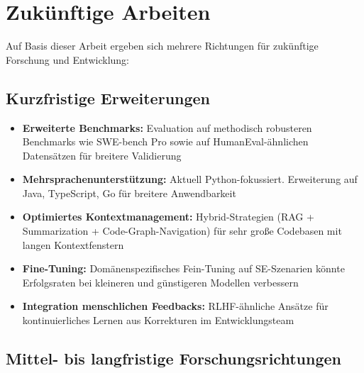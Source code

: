 \section{Zukünftige Arbeiten}

Auf Basis dieser Arbeit ergeben sich mehrere Richtungen für zukünftige Forschung und Entwicklung:

\subsection{Kurzfristige Erweiterungen}

\begin{itemize}
  \item \textbf{Erweiterte Benchmarks:} Evaluation auf methodisch robusteren Benchmarks wie SWE-bench Pro sowie auf HumanEval-ähnlichen Datensätzen für breitere Validierung
  
  \item \textbf{Mehrsprachenunterstützung:} Aktuell Python-fokussiert. Erweiterung auf Java, TypeScript, Go für breitere Anwendbarkeit
  
  \item \textbf{Optimiertes Kontextmanagement:} Hybrid-Strategien (RAG + Summarization + Code-Graph-Navigation) für sehr große Codebasen mit langen Kontextfenstern
  
  \item \textbf{Fine-Tuning:} Domänenspezifisches Fein-Tuning auf SE-Szenarien könnte Erfolgsraten bei kleineren und günstigeren Modellen verbessern
  
  \item \textbf{Integration menschlichen Feedbacks:} RLHF-ähnliche Ansätze für kontinuierliches Lernen aus Korrekturen im Entwicklungsteam
\end{itemize}

\subsection{Mittel- bis langfristige Forschungsrichtungen}

